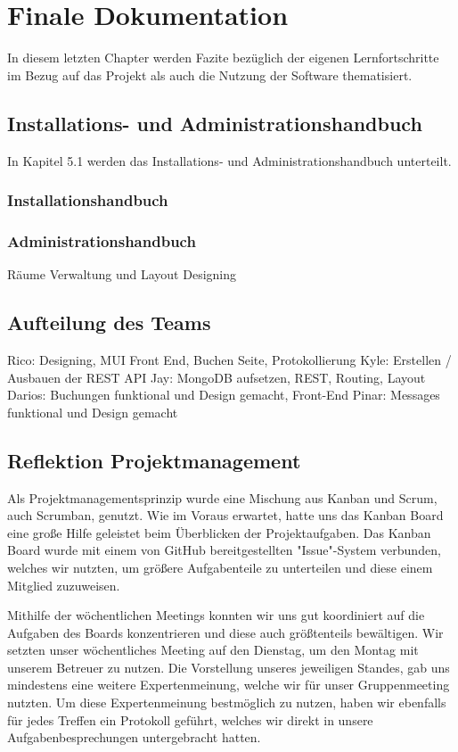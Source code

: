\chapter{Finale Dokumentation}

In diesem letzten Chapter werden Fazite bezüglich der eigenen Lernfortschritte im Bezug auf das Projekt als auch die Nutzung der Software thematisiert.

\section{Installations- und Administrationshandbuch}

In Kapitel 5.1 werden das Installations- und Administrationshandbuch unterteilt.
\subsection{Installationshandbuch}

\subsection{Administrationshandbuch}
Räume Verwaltung und Layout Designing

\section{Aufteilung des Teams}

Rico: Designing, MUI Front End, Buchen Seite, Protokollierung
Kyle: Erstellen / Ausbauen der REST API
Jay: MongoDB aufsetzen, REST, Routing, Layout
Darios: Buchungen funktional und Design gemacht, Front-End
Pinar: Messages funktional und Design gemacht

\section{Reflektion Projektmanagement}

Als Projektmanagementsprinzip wurde eine Mischung aus Kanban und Scrum, auch Scrumban, genutzt.
Wie im Voraus erwartet, hatte uns das Kanban Board eine große Hilfe geleistet beim Überblicken der Projektaufgaben.
Das Kanban Board wurde mit einem von GitHub bereitgestellten "Issue"-System verbunden, welches wir nutzten, um größere Aufgabenteile zu unterteilen und diese einem Mitglied zuzuweisen.

Mithilfe der wöchentlichen Meetings konnten wir uns gut koordiniert auf die Aufgaben des Boards konzentrieren und diese auch größtenteils bewältigen.
Wir setzten unser wöchentliches Meeting auf den Dienstag, um den Montag mit unserem Betreuer zu nutzen.
Die Vorstellung unseres jeweiligen Standes, gab uns mindestens eine weitere Expertenmeinung, welche wir für unser Gruppenmeeting nutzten.
Um diese Expertenmeinung bestmöglich zu nutzen, haben wir ebenfalls für jedes Treffen ein Protokoll geführt, welches wir direkt in unsere Aufgabenbesprechungen untergebracht hatten.


